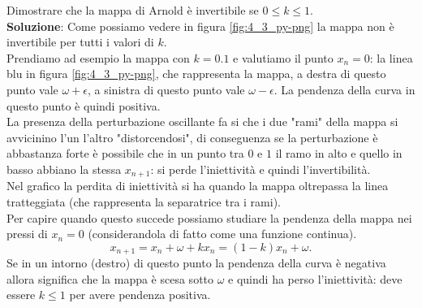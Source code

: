 \begin{ex}
       Dimostrare che la mappa di Arnold è invertibile se $0\le k\le 1$.\\
       \textbf{Soluzione}:
       Come possiamo vedere in figura \ref{fig:4_3_py-png} la mappa non è invertibile per tutti i valori di $k$. \\
       Prendiamo ad esempio la mappa con $k=0.1$ e valutiamo il punto $x_n=0$: la linea blu in figura \ref{fig:4_3_py-png}, che rappresenta la mappa, a destra di questo punto vale $\omega+\epsilon$, a sinistra di questo punto vale $\omega-\epsilon$. La pendenza della curva in questo punto è quindi positiva.\\
       La presenza della perturbazione oscillante fa si che i due "rami" della mappa si avvicinino l'un l'altro "distorcendosi", di conseguenza se la perturbazione è abbastanza forte è possibile che in un punto tra $0$ e $1$ il ramo in alto e quello in basso abbiano la stessa $x_{n+1}$: si perde l'iniettività e quindi l'invertibilità.\\
       Nel grafico la perdita di iniettività si ha quando la mappa oltrepassa la linea tratteggiata (che rappresenta la separatrice tra i rami).\\
       Per capire quando questo succede possiamo studiare la pendenza della mappa nei pressi di $x_n = 0$ (considerandola di fatto come una funzione continua).
       \[
	   x_{n+1} = x_n + \omega + k x_n = (1-k) x_n + \omega
       .\] 
       Se in un intorno (destro) di questo punto la pendenza della curva è negativa allora significa che la mappa è scesa sotto $\omega$ e quindi ha perso l'iniettività: deve essere $k\le 1$ per avere pendenza positiva.
\end{ex}
\noindent

